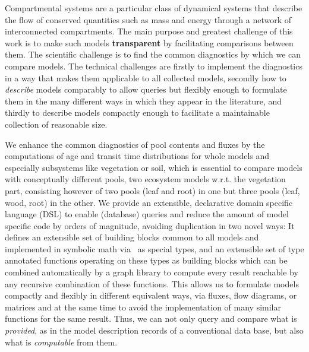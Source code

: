 
Compartmental systems are a particular class of dynamical systems that describe
the flow of conserved quantities such as mass and energy through a network of
interconnected compartments. The main purpose and greatest challenge of this
work is to make such models {\bf transparent} by  facilitating  comparisons
between them.  The scientific challenge is to find the common
diagnostics by which we can compare models. The technical challenges are
firstly to implement the diagnostics in a way that makes them applicable to all collected
models, secondly how to \emph{describe} models comparably to allow queries but flexibly enough 
to formulate them in the many different
ways in which they appear in the literature, and thirdly to describe models compactly enough to facilitate a maintainable collection of reasonable size.

We enhance the common diagnostics of pool contents and fluxes by the 
computations of age and transit time distributions for whole models and
especially subsystems like vegetation or soil, which is essential 
to compare models with conceptually different pools, \ie two ecosystem models
w.r.t. the vegetation part, consisting however of two pools
(\ie leaf and root) in one but three pools (\ie leaf, wood, root) in the
other.  
We provide an extensible, declarative domain specific language (DSL) to enable (database) queries and reduce the amount of model specific code by orders of magnitude, avoiding duplication in two novel ways: It  defines an extensible set of 
building blocks common to all models and implemented in symbolic math via \sympy\ as special types, and an extensible set of type annotated functions operating on these types as 
building blocks which can be combined automatically by a graph library to compute every result
reachable by any recursive combination of these functions. 
This allows us to formulate models compactly and
flexibly in different equivalent ways, \ie via fluxes, flow diagrams, or
matrices and at the same time to avoid the implementation of many similar
functions for the same result.  Thus, we can not only query and compare
what is \emph{provided}, as in the model description records of a conventional data
base, but also what is \emph{computable} from them.  

